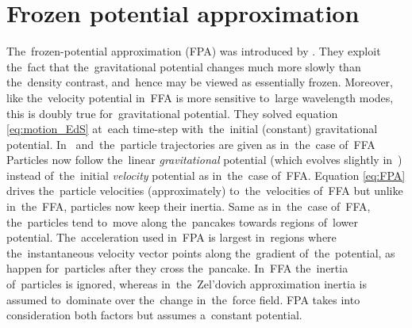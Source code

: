 \section{Frozen potential approximation}
The~frozen-potential approximation (FPA) was introduced by \textcite{1994MNRAS.266..227B}. They exploit the~fact that the~gravitational potential changes much more slowly than the~density contrast, and~hence may be viewed as essentially frozen. Moreover, like the~velocity potential in~FFA is more sensitive to~large wavelength modes, this is doubly true for~gravitational potential. They solved equation \eqref{eq:motion_EdS} at~each time-step with~the~initial (constant) gravitational potential. In~\LCDM
{}
and~the~particle trajectories are given as in~the~case of~FFA\,
Particles now follow the~linear \textit{gravitational} potential (which evolves slightly in~\LCDM) instead of~the~initial \textit{velocity} potential as in~the~case of~FFA. Equation \eqref{eq:FPA} drives the~particle velocities (approximately) to~the~velocities of~FFA but unlike in~the~FFA, particles now keep their inertia. Same as in~the~case of~FFA, the~particles tend to~move along the~pancakes towards regions of~lower potential. The~acceleration used in~FPA is largest in~regions where the~instantaneous velocity vector points along the~gradient of~the~potential, as happen for~particles after they cross the~pancake. In~FFA the~inertia of~particles is ignored, whereas in~the~Zel'dovich approximation inertia is assumed to~dominate over the~change in~the~force field. FPA takes into consideration both factors but assumes a~constant potential.

